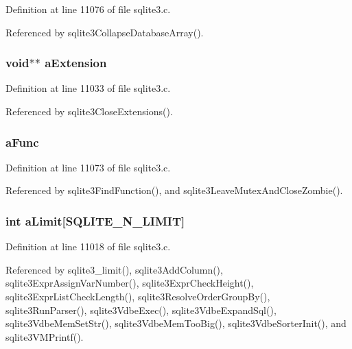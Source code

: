 Definition at line 11076 of file sqlite3.\+c.



Referenced by sqlite3\+Collapse\+Database\+Array().

\hypertarget{structsqlite3_a1052b9fcfc19b54f8d8c16bfcaafe546}{}
\subsubsection[{a\+Extension}]{\setlength{\rightskip}{0pt plus 5cm}void$\ast$$\ast$ a\+Extension}\label{structsqlite3_a1052b9fcfc19b54f8d8c16bfcaafe546}


Definition at line 11033 of file sqlite3.\+c.



Referenced by sqlite3\+Close\+Extensions().

\hypertarget{structsqlite3_af92474755f8d684fe07f9aa207c179f6}{}
\subsubsection[{a\+Func}]{ a\+Func}\label{structsqlite3_af92474755f8d684fe07f9aa207c179f6}


Definition at line 11073 of file sqlite3.\+c.



Referenced by sqlite3\+Find\+Function(), and sqlite3\+Leave\+Mutex\+And\+Close\+Zombie().

\hypertarget{structsqlite3_acd0901741e378caf769163f3b3306c5f}{}
\subsubsection[{a\+Limit}]{\setlength{\rightskip}{0pt plus 5cm}int a\+Limit\mbox{[}{\bf S\+Q\+L\+I\+T\+E\+\_\+\+N\+\_\+\+L\+I\+M\+I\+T}\mbox{]}}\label{structsqlite3_acd0901741e378caf769163f3b3306c5f}


Definition at line 11018 of file sqlite3.\+c.



Referenced by sqlite3\+\_\+limit(), sqlite3\+Add\+Column(), sqlite3\+Expr\+Assign\+Var\+Number(), sqlite3\+Expr\+Check\+Height(), sqlite3\+Expr\+List\+Check\+Length(), sqlite3\+Resolve\+Order\+Group\+By(), sqlite3\+Run\+Parser(), sqlite3\+Vdbe\+Exec(), sqlite3\+Vdbe\+Expand\+Sql(), sqlite3\+Vdbe\+Mem\+Set\+Str(), sqlite3\+Vdbe\+Mem\+Too\+Big(), sqlite3\+Vdbe\+Sorter\+Init(), and sqlite3\+V\+M\+Printf().

